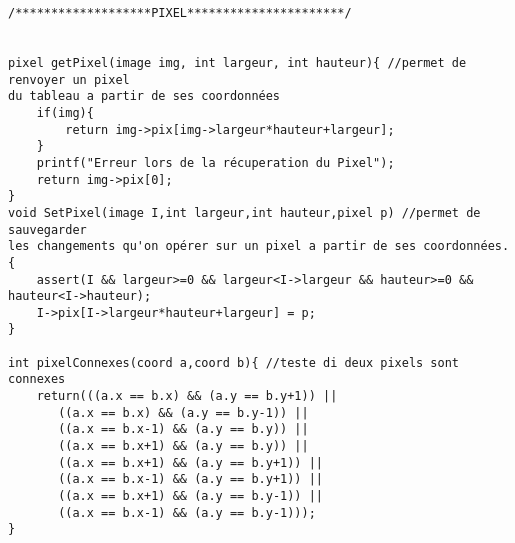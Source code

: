 \documentclass[a4paper , 10pt]{article}
\begin{document}
\begin{verbatim}
/*******************PIXEL**********************/


pixel getPixel(image img, int largeur, int hauteur){ //permet de renvoyer un pixel 
du tableau a partir de ses coordonnées 
	if(img){
		return img->pix[img->largeur*hauteur+largeur];
	}
	printf("Erreur lors de la récuperation du Pixel");
	return img->pix[0];	
}
void SetPixel(image I,int largeur,int hauteur,pixel p) //permet de sauvegarder 
les changements qu'on opérer sur un pixel a partir de ses coordonnées.
{
	assert(I && largeur>=0 && largeur<I->largeur && hauteur>=0 && hauteur<I->hauteur);
	I->pix[I->largeur*hauteur+largeur] = p;
}

int pixelConnexes(coord a,coord b){ //teste di deux pixels sont connexes
	return(((a.x == b.x) && (a.y == b.y+1)) ||
	   ((a.x == b.x) && (a.y == b.y-1)) ||
	   ((a.x == b.x-1) && (a.y == b.y)) ||
	   ((a.x == b.x+1) && (a.y == b.y)) ||
	   ((a.x == b.x+1) && (a.y == b.y+1)) ||
	   ((a.x == b.x-1) && (a.y == b.y+1)) ||
	   ((a.x == b.x+1) && (a.y == b.y-1)) ||
	   ((a.x == b.x-1) && (a.y == b.y-1)));			
}


\end{verbatim}
\end{document}
